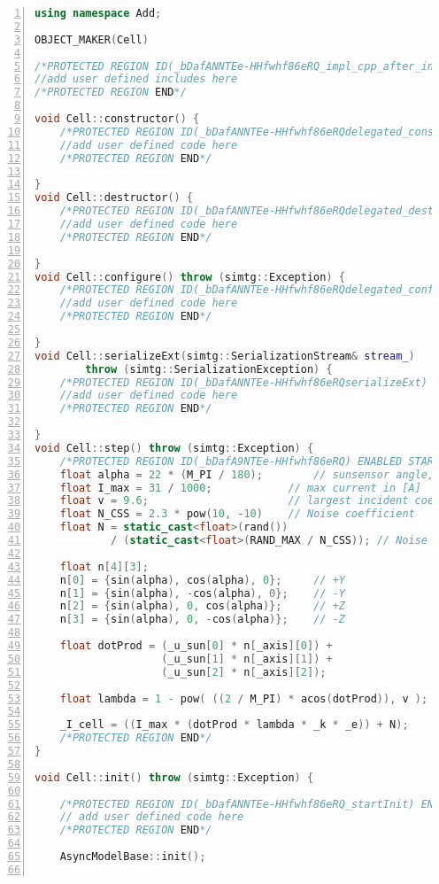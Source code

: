 \begin{appendices}
\begin{lstlisting}[frame=single,
numbers=left, basicstyle=\tiny, language = C++]
using namespace Add;

OBJECT_MAKER(Cell)

/*PROTECTED REGION ID(_bDafANNTEe-HHfwhf86eRQ_impl_cpp_after_includeimplementation) ENABLED START*/
//add user defined includes here
/*PROTECTED REGION END*/

void Cell::constructor() {
	/*PROTECTED REGION ID(_bDafANNTEe-HHfwhf86eRQdelegated_constructor) ENABLED START*/
	//add user defined code here
	/*PROTECTED REGION END*/

}
void Cell::destructor() {
	/*PROTECTED REGION ID(_bDafANNTEe-HHfwhf86eRQdelegated_destructor) ENABLED START*/
	//add user defined code here
	/*PROTECTED REGION END*/

}
void Cell::configure() throw (simtg::Exception) {
	/*PROTECTED REGION ID(_bDafANNTEe-HHfwhf86eRQdelegated_configure) ENABLED START*/
	//add user defined code here
	/*PROTECTED REGION END*/

}
void Cell::serializeExt(simtg::SerializationStream& stream_)
		throw (simtg::SerializationException) {
	/*PROTECTED REGION ID(_bDafANNTEe-HHfwhf86eRQserializeExt) ENABLED START*/
	//add user defined code here
	/*PROTECTED REGION END*/

}
void Cell::step() throw (simtg::Exception) {
	/*PROTECTED REGION ID(_bDafA9NTEe-HHfwhf86eRQ) ENABLED START*/
	float alpha = 22 * (M_PI / 180);		// sunsensor angle, converted to rad
	float I_max = 31 / 1000;			// max current in [A]
	float v = 9.6;						// largest incident coeff [-]
	float N_CSS = 2.3 * pow(10, -10)	// Noise coefficient
	float N = static_cast<float>(rand())
			/ (static_cast<float>(RAND_MAX / N_CSS)); // Noise

	float n[4][3];
	n[0] = {sin(alpha), cos(alpha), 0};		// +Y
	n[1] = {sin(alpha), -cos(alpha), 0};	// -Y
	n[2] = {sin(alpha), 0, cos(alpha)};		// +Z
	n[3] = {sin(alpha), 0, -cos(alpha)};	// -Z

	float dotProd = (_u_sun[0] * n[_axis][0]) +
					(_u_sun[1] * n[_axis][1]) +
					(_u_sun[2] * n[_axis][2]);

	float lambda = 1 - pow( ((2 / M_PI) * acos(dotProd)), v );

	_I_cell = ((I_max * (dotProd * lambda * _k * _e)) + N);
	/*PROTECTED REGION END*/
}

void Cell::init() throw (simtg::Exception) {

	/*PROTECTED REGION ID(_bDafANNTEe-HHfwhf86eRQ_startInit) ENABLED START*/
	// add user defined code here
	/*PROTECTED REGION END*/

	AsyncModelBase::init();


\end{lstlisting}
\end{appendices}
